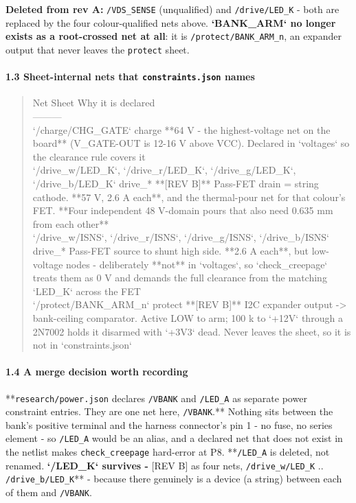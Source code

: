 \documentclass[11pt,a4paper]{article}
\begin{document}
\textbf{Deleted from rev A:} \texttt{/VDS\_SENSE} (unqualified) and \texttt{/drive/LED\_K} - both are replaced by the four colour-qualified nets above. \textbf{`BANK\_ARM` no longer exists as a root-crossed net at all}: it is \texttt{/protect/BANK\_ARM\_n}, an expander output that never leaves the \texttt{protect} sheet.

\paragraph*{1.3 Sheet-internal nets that \texttt{constraints.json} names}
\begin{quote}\small\ttfamily\raggedright
\textbar{} Net \textbar{} Sheet \textbar{} Why it is declared \textbar{}\\
\textbar{}---\textbar{}---\textbar{}---\textbar{}\\
\textbar{} `/charge/CHG\_GATE` \textbar{} charge \textbar{} {*}{*}64 V - the highest-voltage net on the board{*}{*} (V\_GATE-OUT is 12-16 V above VCC). Declared in `voltages` so the clearance rule covers it \textbar{}\\
\textbar{} `/drive\_w/LED\_K`, `/drive\_r/LED\_K`, `/drive\_g/LED\_K`, `/drive\_b/LED\_K` \textbar{} drive\_{*} \textbar{} {*}{*}{[}REV B{]}{*}{*} Pass-FET drain = string cathode. {*}{*}57 V, 2.6 A each{*}{*}, and the thermal-pour net for that colour's FET. {*}{*}Four independent 48 V-domain pours that also need 0.635 mm from each other{*}{*} \textbar{}\\
\textbar{} `/drive\_w/ISNS`, `/drive\_r/ISNS`, `/drive\_g/ISNS`, `/drive\_b/ISNS` \textbar{} drive\_{*} \textbar{} Pass-FET source to shunt high side. {*}{*}2.6 A each{*}{*}, but low-voltage nodes - deliberately {*}{*}not{*}{*} in `voltages`, so `check\_creepage` treats them as 0 V and demands the full clearance from the matching `LED\_K` across the FET \textbar{}\\
\textbar{} `/protect/BANK\_ARM\_n` \textbar{} protect \textbar{} {*}{*}{[}REV B{]}{*}{*} I2C expander output -\textgreater{} bank-ceiling comparator. Active LOW to arm; 100 k to `+12V` through a 2N7002 holds it disarmed with `+3V3` dead. Never leaves the sheet, so it is not in `constraints.json` \textbar{}
\end{quote}
\paragraph*{1.4 A merge decision worth recording}
{*}{*}\texttt{research/power.json} declares \texttt{/VBANK} and \texttt{/LED\_A} as separate power constraint entries. They are one net here, \texttt{/VBANK}.{*}{*} Nothing sits between the bank's positive terminal and the harness connector's pin 1 - no fuse, no series element - so \texttt{/LED\_A} would be an alias, and a declared net that does not exist in the netlist makes \texttt{check\_creepage} hard-error at P8. {*}{*}\texttt{/LED\_A} is deleted, not renamed.\textbf{ `/LED\_K` survives - }{[}REV B{]} as four nets, \texttt{/drive\_w/LED\_K} .. \texttt{/drive\_b/LED\_K}{*}{*} - because there genuinely is a device (a string) between each of them and \texttt{/VBANK}.
\end{document}
